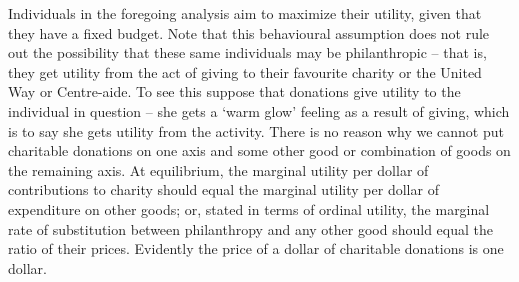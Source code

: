 Individuals in the foregoing analysis aim to maximize their utility, given
that they have a fixed budget. Note that this behavioural assumption does
not rule out the possibility that these same individuals may be
philanthropic -- that is, they get utility from the act of giving to their
favourite charity or the United Way or Centre-aide. To see this suppose that
donations give utility to the individual in question -- she gets a `warm
glow' feeling as a result of giving, which is to say she gets utility from
the activity. There is no reason why we cannot put charitable donations on
one axis and some other good or combination of goods on the remaining axis.
At equilibrium, the marginal utility per dollar of contributions to charity
should equal the marginal utility per dollar of expenditure on other goods;
or, stated in terms of ordinal utility, the marginal rate of substitution
between philanthropy and any other good should equal the ratio of their
prices. Evidently the price of a dollar of charitable donations is one
dollar.
